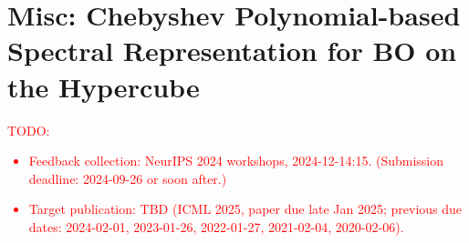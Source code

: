 \documentclass{article}
\begin{document}
%

\section{Misc: Chebyshev Polynomial-based Spectral Representation
  for BO on the Hypercube}

\textcolor{red}{TODO:
\begin{itemize}
\item
  Feedback collection: NeurIPS 2024 workshops, 2024-12-14:15.
  (Submission deadline: 2024-09-26 or soon after.)
\item
  Target publication: TBD (ICML 2025, paper due late Jan 2025; previous
  due dates: 2024-02-01, 2023-01-26, 2022-01-27, 2021-02-04,
  2020-02-06).
\end{itemize}
}





\end{document}
